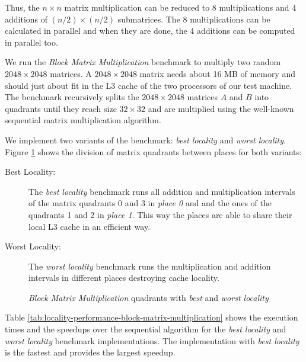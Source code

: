 Thus, the $n \times n$ matrix multiplication can be reduced to 8
multiplications and 4 additions of $(n/2) \times (n/2)$
submatrices. The 8 multiplications can be calculated in parallel and
when they are done, the 4 additions can be computed in parallel too.

We run the \emph{Block Matrix Multiplication} benchmark to multiply
two random $2048 \times 2048$ matrices. A $2048 \times 2048$ matrix
needs about 16 MB of memory and should just about fit in the L3 cache
of the two processors of our test machine. The benchmark recursively
splits the $2048 \times 2048$ matrices $A$ and $B$ into quadrants
until they reach size $32 \times 32$ and are multiplied using the
well-known sequential matrix multiplication algorithm.

We implement two variants of the benchmark: \emph{best locality} and
\emph{worst locality}. Figure
\ref{fig:locality-performance-block-matrix-multiplication-locality}
shows the division of matrix quadrants between places for both
variants:

\begin{description}
\item[Best Locality:] The \emph{best locality} benchmark runs all
  addition and multiplication intervals of the matrix quadrants 0 and
  3 in \emph{place 0} and and the ones of the quadrants 1 and 2 in
  \emph{place 1}. This way the places are able to share their local L3
  cache in an efficient way.
\item[Worst Locality:] The \emph{worst locality} benchmark runs the
  multiplication and addition intervals in different places destroying
  cache locality.
\end{description}

\begin{figure}[!ht]
  \centering
  \caption{\emph{Block Matrix Multiplication} quadrants with \emph{best} and \emph{worst locality}}
  \label{fig:locality-performance-block-matrix-multiplication-locality}
\end{figure}

Table \ref{tab:locality-performance-block-matrix-multiplication} shows
the execution times and the speedups over the sequential algorithm for
the \emph{best locality} and \emph{worst locality} benchmark
implementations. The implementation with \emph{best locality} is the
fastest and provides the largest speedup.


